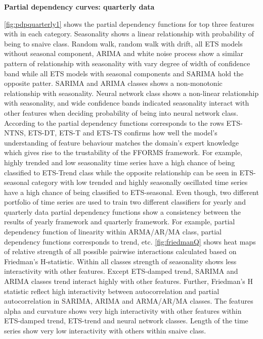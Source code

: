 \documentclass[11pt,a4paper,]{article}
\theoremstyle{definition}
\theoremstyle{definition}
\theoremstyle{definition}
\theoremstyle{remark}
\begin{document}
\textbf{Partial dependency curves: quarterly data}

\autoref{fig:pdpquarterly1} shows the partial dependency functions for
top three features with in each category. Seasonality shows a linear
relationship with probability of being to snaive class. Random walk,
random walk with drift, all ETS models without seasonal component, ARIMA
and white noise process show a similar pattern of relationship with
seasonality with vary degree of width of confidence band while all ETS
models with seasonal components and SARIMA hold the opposite patter.
SARIMA and ARIMA classes shows a non-monotonic relationship with
seasonality. Neural network class shows a non-linear relationship with
seasonality, and wide confidence bands indicated seasonality interact
with other features when deciding probability of being into neural
network class. According to the partial dependency functions corresponds
to the rows ETS-NTNS, ETS-DT, ETS-T and ETS-TS confirms how well the
model's understanding of feature behaviour matches the domain's expert
knowledge which gives rise to the trustability of the FFORMS framework.
For example, highly trended and low seasonality time series have a high
chance of being classified to ETS-Trend class while the opposite
relationship can be seen in ETS-seasonal category with low trended and
highly seasonally oscillated time series have a high chance of being
classified to ETS-seasonal. Even though, two different portfolio of time
series are used to train two different classifiers for yearly and
quarterly data partial dependency functions show a consistency between
the results of yearly framework and quarterly framework. For example,
partial dependency function of linearity within ARMA/AR/MA class,
partial dependency functions corresponds to trend, etc.
\autoref{fig:friedmanQ} shows heat maps of relative strength of all
possible pairwise interactions calculated based on Friedman's
H-statistic. Within all classes strength of seasonality shows less
interactivity with other features. Except ETS-damped trend, SARIMA and
ARIMA classes trend interact highly with other features. Further,
Friedman's H statistic reflect high interactivity between
autocorrelation and partial autocorrelation in SARIMA, ARIMA and
ARMA/AR/MA classes. The features alpha and curvature shows very high
interactivity with other features within ETS-damped trend, ETS-trend and
neural network classes. Length of the time series show very low
interactivity with others within snaive class.

\newpage
\end{document}
